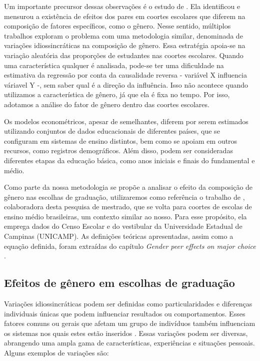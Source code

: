 Um importante precursor dessas observações é o estudo de \citet{Hoxby-2000}. Ela identificou e mensurou a existência de efeitos dos pares em coortes escolares que diferem na composição de fatores específicos, como o gênero. Nesse sentido, múltiplos trabalhos exploram o problema com uma metodologia similar, denominada de variações idiossincráticas na composição de gênero. Essa estratégia apoia-se na variação aleatória das proporções de estudantes nas coortes escolares. Quando uma característica qualquer é analisada, pode-se ter uma dificuldade na estimativa da regressão por conta da causalidade reversa - variável X influencia váriavel Y -, sem saber qual é a direção da influência. Isso não acontece quando utilizamos a característica de gênero, já que ela é fixa no tempo. Por isso, adotamos a análise do fator de gênero dentro das coortes escolares.

Os modelos econométricos, apesar de semelhantes, diferem por serem estimados utilizando conjuntos de dados educacionais de diferentes países, que se configuram em sistemas de ensino distintos, bem como se apoiam em outros recursos, como registros demográficos. Além disso, podem ser consideradas diferentes etapas da educação básica, como anos iniciais e finais do fundamental e médio. 

Como parte da nossa metodologia se propõe a analisar o efeito da composição de gênero nas escolhas de graduação, utilizaremos como referência o trabalho de \cite{Borges2021}, colaboradora desta pesquisa de mestrado, que se volta para coortes de escolas de ensino médio brasileiras, um contexto similar ao nosso. Para esse propósito, ela emprega dados do Censo Escolar e do vestibular da Universidade Estadual de Campinas (UNICAMP). As definições teóricas apresentadas, assim como a equação definida, foram extraídas do capítulo \textit{Gender peer effects on major choice} \autocite{Borges2021}. 

\subsection{Efeitos de gênero em escolhas de graduação}
Variações idiossincráticas podem ser definidas como particularidades e diferenças individuais únicas que podem influenciar resultados ou comportamentos. Esses fatores comuns ou gerais que afetam um grupo de indivíduos também influenciam os sistemas nos quais estes estão inseridos \autocite{Meister1991}. Essas variações podem ser diversas, abrangendo uma ampla gama de características, experiências e situações pessoais. Alguns exemplos de variações são:

